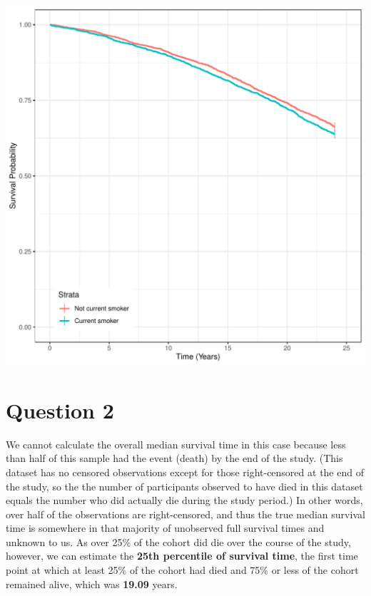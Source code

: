 \documentclass{article}\usepackage[]{graphicx}\usepackage[]{color}
\makeatletter
\def\maxwidth{ %
  \ifdim\Gin@nat@width>\linewidth
    \linewidth
  \else
    \Gin@nat@width
  \fi
}
\newenvironment{knitrout}{}{} %
\newif\ifdraft  %
\makeatother
\begin{document}
\begin{knitrout}
\color{fgcolor}
\includegraphics[width=\maxwidth]{figure/unnamed-chunk-15-1} 

\end{knitrout}

\pagebreak

\section*{Question 2}

\ifdraft

\textbf{Referring to the code from lecture}, are you able to calculate the overall median survival time in this case? If so, provide an estimate of this quantity, if not, describe why and provide an estimate of a percentile of survival time (of your choice). Interpret the quantity that you estimated. \textbf{(20 points)}

\vspace{2mm}



\fi

We cannot calculate the overall median survival time in this case because less than half of this sample had the event (death) by the end of the study.  (This dataset has no censored observations except for those right-censored at the end of the study, so the the number of participants observed to have died in this dataset equals the number who did actually die during the study period.)  In other words, over half of the observations are right-censored, and thus the true median survival time is somewhere in that majority of unobserved full survival times and unknown to us.  As over 25\% of the cohort did die over the course of the study, however, we can estimate the \textbf{25th percentile of survival time}, the first time point at which at least 25\% of the cohort had died and 75\% or less of the cohort remained alive, which was \textbf{19.09} years.  
\end{document}
